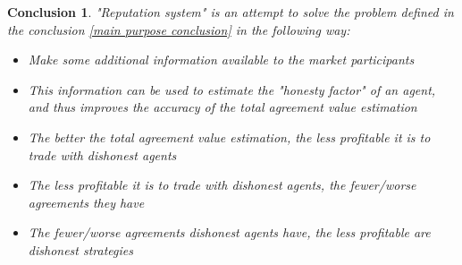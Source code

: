 \documentclass{article}
\newtheorem{conclusion}{Conclusion}[section]
\begin{document}
\begin{conclusion}

"Reputation system" is an attempt to solve the problem defined in the conclusion \ref{main purpose conclusion} in the following way:

\begin{itemize}
    \item{Make some additional information available to the market participants}
    \item{This information can be used to estimate the "honesty factor" of an agent, and thus improves the accuracy of the total agreement value estimation}
    \item{The better the total agreement value estimation, the less profitable it is to trade with dishonest agents}
    \item{The less profitable it is to trade with dishonest agents, the fewer/worse agreements they have}
    \item{The fewer/worse agreements dishonest agents have, the less profitable are dishonest strategies}
\end{itemize}

\end{conclusion}
\end{document}
